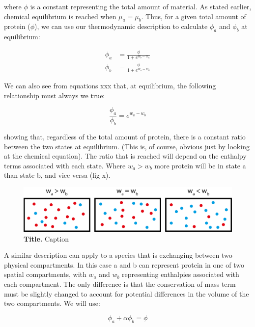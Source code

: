 \documentclass[12pt]{"article"}
\newcommand{\mycaption}[2]{\caption[#1]{\textbf{#1.} #2}}
\begin{document}
where $\phi$ is a constant representing the total amount of material. As stated earlier, chemical equilibrium is reached when $\mu_a = \mu_b$. Thus, for a given total amount of protein ($\phi$), we can use our thermodynamic description to calculate $\phi_a$ and $\phi_b$ at equilibrium:

\begin{align}
\phi_a &= \frac{\phi}{1 + e^{w_b - w_a}}\\
\phi_b &= \frac{\phi}{1 + e^{w_a - w_b}}
\end{align}

We can also see from equations xxx that, at equilibrium, the following relationship must always we true:

\begin{equation}
\frac{\phi_a}{\phi_b} = e^{w_a - w_b}
\end{equation}

showing that, regardless of the total amount of protein, there is a constant ratio between the two states at equilibrium. (This is, of course, obvious just by looking at the chemical equation). The ratio that is reached will depend on the enthalpy terms associated with each state. Where $w_a > w_b$ more protein will be in state a than state b, and vice versa (fig x).\\

\begin{figure}[!h]
\includegraphics[scale=0.9]{thermodynamic_simple_example2}
\setlength{\abovecaptionskip}{20pt}
\centering
\mycaption{Title}{Caption}
\end{figure}

A similar description can apply to a species that is exchanging between two physical compartments. In this case a and b can represent protein in one of two spatial compartments, with $w_a$ and $w_b$ representing enthalpies associated with each compartment. The only difference is that the conservation of mass term must be slightly changed to account for potential differences in the volume of the two compartments. We will use:

\begin{equation}
\phi_a + \alpha\phi_b = \phi
\end{equation}
\end{document}
